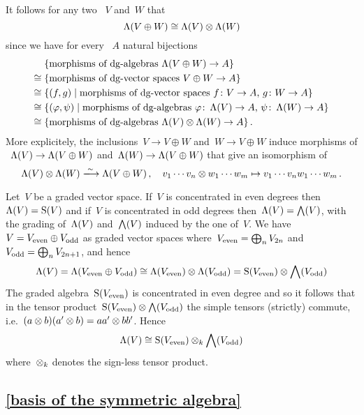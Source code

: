 \documentclass[a4paper,10pt,headings=standardclasses]{scrartcl}
\begin{document}
It follows for any two {\dgvs}~$V$ and~$W$ that
\[
  \operatorname{\Lambda}(V \oplus W)
  \cong
  \operatorname{\Lambda}(V) \otimes \operatorname{\Lambda}(W)
\]
since we have for every {\dga}~$A$ natural bijections
\begin{align*}
  {}&
  \{ \text{morphisms of {\dgas}~$\dgSymm(V \oplus W) \to A$} \}
  \\
  \cong{}&
  \{ \text{morphisms of {\dgvs}~$V \oplus W \to A$} \}
  \\
  \cong{}&
  \{
    (f,g)
  \suchthat
    \text{morphisms of {\dgvs}~$f \colon V \to A$,~$g \colon W \to A$}
  \}
  \\
  \cong{}&
  \{
    (\varphi, \psi)
  \suchthat
    \text{morphisms of {\dgas}~$\varphi \colon \dgSymm(V) \to A$,~$\psi \colon \dgSymm(W) \to A$}
  \}
  \\
  \cong{}&
  \{ \text{morphisms of {\dgas}~$\dgSymm(V) \tensor \dgSymm(W) \to A$} \} \,.
\end{align*}
More explicitely, the inclusions~$V \to V \oplus W$ and~$W \to V \oplus W$ induce morphisms of {\dgas}~$\operatorname{\Lambda}(V) \to \operatorname{\Lambda}(V \oplus W)$ and~$\operatorname{\Lambda}(W) \to \operatorname{\Lambda}(V \oplus W)$ that give an isomorphism of {\dgas}
\[
  \dgSymm(V) \tensor \dgSymm(W)
  \xlongto{\sim}
  \dgSymm(V \oplus W) \,,
  \quad
  v_1 \dotsm v_n \tensor w_1 \dotsm w_m
  \mapsto
  v_1 \dotsm v_n w_1 \dotsm w_m \,.
\]

Let~$V$ be a graded vector space.
If~$V$ is concentrated in even degrees then~$\operatorname{\Lambda}(V) = \operatorname{S}(V)$ and if~$V$ is concentrated in odd degrees then~$\operatorname{\Lambda}(V) = \bigwedge(V)$, with the grading of~$\operatorname{\Lambda}(V)$ and~$\bigwedge(V)$ induced by the one of~$V$.
We have~$V = V_{\mathrm{even}} \oplus V_{\mathrm{odd}}$ as graded vector spaces where~$V_{\mathrm{even}} = \bigoplus_n V_{2n}$ and~$V_{\mathrm{odd}} = \bigoplus_n V_{2n+1}$, and hence
\[
  \operatorname{\Lambda}(V)
  =
  \operatorname{\Lambda}(V_{\mathrm{even}} \oplus V_{\mathrm{odd}})
  \cong
  \operatorname{\Lambda}(V_{\mathrm{even}}) \otimes \operatorname{\Lambda}(V_{\mathrm{odd}})
  =
  \operatorname{S}(V_{\mathrm{even}}) \otimes \bigwedge(V_{\mathrm{odd}})
\]
The graded algebra~$\operatorname{S}(V_{\mathrm{even}})$ is concentrated in even degree and so it follows that in the tensor product~$\operatorname{S}(V_{\mathrm{even}}) \otimes \bigwedge(V_{\mathrm{odd}})$ the simple tensors (strictly) commute, i.e.~$(a \otimes b)(a' \otimes b) = a a' \otimes b b'$.
Hence
\[
  \operatorname{\Lambda}(V)
  \cong
  \operatorname{S}(V_{\mathrm{even}}) \otimes_k \bigwedge(V_{\mathrm{odd}})
\]
where~$\otimes_k$ denotes the sign-less tensor product.



\subsection{\cref{basis of the symmetric algebra}}
\label{basis of the symmetric algebra proof}
\end{document}
